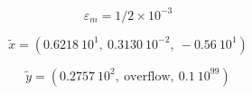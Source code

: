 \[ \varepsilon_m=1/2 \times 10^{-3} \]

\medskip
\[ \widetilde{x}=(0.6218\ 10^1, \ 0.3130\ 10^{-2}, \ -0.56\ 10^1) \]

\medskip
\[ \widetilde{y}=( 0.2757\ 10^2,\ \mbox{overflow}, \ 0.1\ 10^{99}) \]
